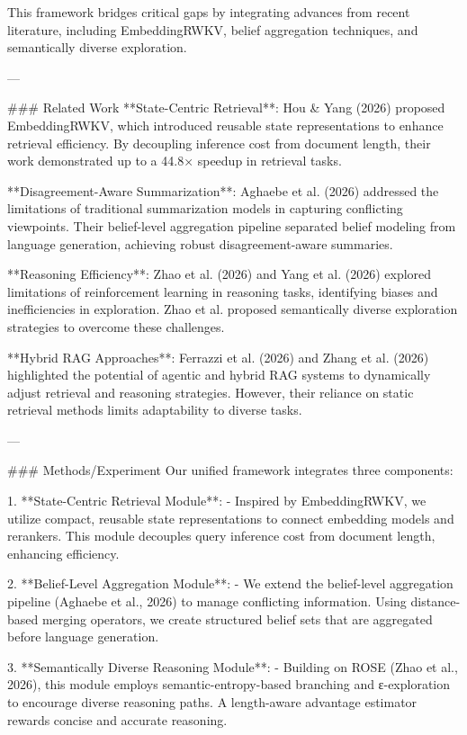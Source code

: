 This framework bridges critical gaps by integrating advances from recent literature, including EmbeddingRWKV, belief aggregation techniques, and semantically diverse exploration.  

---

### Related Work  
**State-Centric Retrieval**: Hou & Yang (2026) proposed EmbeddingRWKV, which introduced reusable state representations to enhance retrieval efficiency. By decoupling inference cost from document length, their work demonstrated up to a 44.8× speedup in retrieval tasks.  

**Disagreement-Aware Summarization**: Aghaebe et al. (2026) addressed the limitations of traditional summarization models in capturing conflicting viewpoints. Their belief-level aggregation pipeline separated belief modeling from language generation, achieving robust disagreement-aware summaries.  

**Reasoning Efficiency**: Zhao et al. (2026) and Yang et al. (2026) explored limitations of reinforcement learning in reasoning tasks, identifying biases and inefficiencies in exploration. Zhao et al. proposed semantically diverse exploration strategies to overcome these challenges.  

**Hybrid RAG Approaches**: Ferrazzi et al. (2026) and Zhang et al. (2026) highlighted the potential of agentic and hybrid RAG systems to dynamically adjust retrieval and reasoning strategies. However, their reliance on static retrieval methods limits adaptability to diverse tasks.  

---

### Methods/Experiment  
Our unified framework integrates three components:  

1. **State-Centric Retrieval Module**:  
   - Inspired by EmbeddingRWKV, we utilize compact, reusable state representations to connect embedding models and rerankers. This module decouples query inference cost from document length, enhancing efficiency.  

2. **Belief-Level Aggregation Module**:  
   - We extend the belief-level aggregation pipeline (Aghaebe et al., 2026) to manage conflicting information. Using distance-based merging operators, we create structured belief sets that are aggregated before language generation.  

3. **Semantically Diverse Reasoning Module**:  
   - Building on ROSE (Zhao et al., 2026), this module employs semantic-entropy-based branching and ε-exploration to encourage diverse reasoning paths. A length-aware advantage estimator rewards concise and accurate reasoning.  

